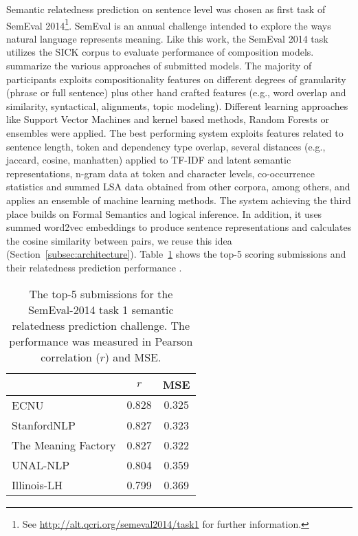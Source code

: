 Semantic relatedness prediction on sentence level was chosen as first task of SemEval 2014\footnote{See \url{http://alt.qcri.org/semeval2014/task1} for further information.}. SemEval is an annual challenge intended to explore the ways natural language represents meaning. Like this work, the SemEval 2014 task utilizes the SICK \autocite{marelli_sick_2014} corpus to evaluate performance of composition models. \textcite{marelli_semeval-2014_2014} summarize the various approaches of submitted models. The majority of participants exploits compositionality features on different degrees of granularity (phrase or full sentence) plus other hand crafted features (e.g., word overlap and similarity, syntactical, alignments, topic modeling). Different learning approaches like Support Vector Machines \autocite{cortes_support-vector_1995} and kernel based methods, Random Forests \autocite{breiman_random_2001} or ensembles \autocite{opitz_popular_1999} were applied. The best performing system \autocite{zhao_ecnu_2014} exploits features related to sentence length, token and dependency type overlap, several distances (e.g., jaccard, cosine, manhatten) applied to \ac{TF-IDF} and latent semantic representations, n-gram data at token and character levels, co-occurrence statistics and summed \ac{LSA} data obtained from other corpora, among others, and applies an ensemble of machine learning methods. The system achieving the third place \autocite{bjerva_meaning_2014} builds on Formal Semantics and logical inference. In addition, it uses summed word2vec \autocite{mikolov_distributed_2013} embeddings to produce sentence representations and calculates the cosine similarity between pairs, we reuse this idea (Section~\ref{subsec:architecture}). Table~\ref{tab:semeval14task1_top5} shows the top-5 scoring submissions and their relatedness prediction performance \autocite{marelli_semeval-2014_2014}.

\begin{table}[!htb] 
	\centering
	\begin{tabular}{ l | c  c }
		 & $r$ & MSE \\ \hline
		ECNU & $0.828$ & $0.325$ \\
		StanfordNLP & 0.827 & 0.323 \\
		The Meaning Factory & 0.827 & 0.322 \\
		UNAL-NLP & 0.804 & 0.359 \\
		Illinois-LH & 0.799 & 0.369 \\
	\end{tabular}
	\caption{The top-5 submissions for the SemEval-2014 task 1 semantic relatedness prediction challenge. The performance was measured in Pearson correlation ($r$) and \acf{MSE}.}
	\label{tab:semeval14task1_top5}
\end{table}

